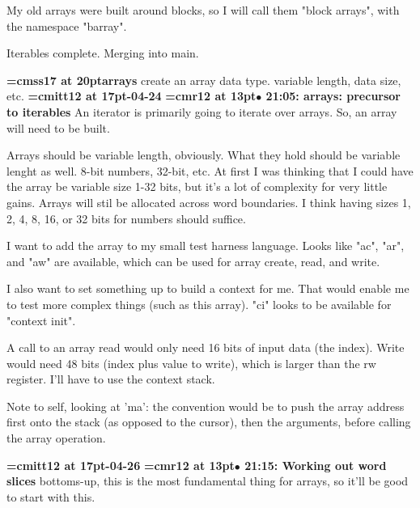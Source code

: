 My old arrays were built around blocks, so I will call them "block arrays", with the namespace "barray".
\par

Iterables complete. Merging into main.
\par

{\medskip\noindent\bf\font\titlefont=cmss17 at 20pt\titlefont arrays}\medskip
create an array data type. variable length, data size, etc.
{\medskip\noindent\bf\font\titlefont=cmitt12 at 17pt-04-24}\medskip
{\smallskip\noindent\bf\font\titlefont=cmr12 at 13pt\titlefont $\bullet$ 21:05: arrays: precursor to iterables}\smallskip
An iterator is primarily going to iterate over arrays. So, an array will need to be built.
\par

Arrays should be variable length, obviously. What they hold should be variable lenght as well. 8-bit numbers, 32-bit, etc. At first I was thinking that I could have the array be variable size 1-32 bits, but it's a lot of complexity for very little gains. Arrays will stil be allocated across word boundaries. I think having sizes 1, 2, 4, 8, 16, or 32 bits for numbers should suffice.
\par

I want to add the array to my small test harness language. Looks like "ac", "ar", and "aw" are available, which can be used for array create, read, and write.
\par

I also want to set something up to build a context for me. That would enable me to test more complex things (such as this array). "ci" looks to be available for "context init".
\par

A call to an array read would only need 16 bits of input data (the index). Write would need 48 bits (index plus value to write), which is larger than the rw register. I'll have to use the context stack.
\par

Note to self, looking at 'ma': the convention would be to push the array address first onto the stack (as opposed to the cursor), then the arguments, before calling the array operation.
\par

{\medskip\noindent\bf\font\titlefont=cmitt12 at 17pt-04-26}\medskip
{\smallskip\noindent\bf\font\titlefont=cmr12 at 13pt\titlefont $\bullet$ 21:15: Working out word slices}\smallskip
bottoms-up, this is the most fundamental thing for arrays, so it'll be good to start with this.
\par

